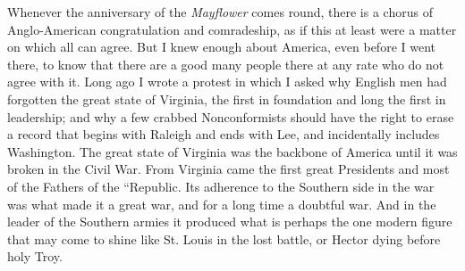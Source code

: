 \documentclass{book}
\begin{document}
Whenever the anniversary of the \emph{Mayflower} comes round, there is a chorus of Anglo-American congratulation and comradeship, as if this at least were a matter on which all can agree. But I knew enough about America, even before I went there, to know that there are a good many people there at any rate who do not agree with it. Long ago I wrote a protest in which I asked why English men had forgotten the great state of Virginia, the first in foundation and long the first in leadership; and why a few crabbed Nonconformists should have the right to erase a record that begins with Raleigh and ends with Lee, and incidentally includes Washington. The great state of Virginia was the backbone of America until it was broken in the Civil War. From Virginia came the first great Presidents and most of the Fathers of the “Republic. Its adherence to the Southern side in the war was what made it a great war, and for a long time a doubtful war. And in the leader of the Southern armies it produced what is perhaps the one modern figure that may come to shine like St. Louis in the lost battle, or Hector dying before holy Troy.
\end{document}
